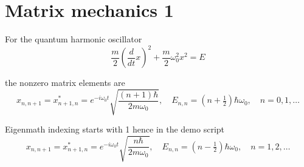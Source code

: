 

\section*{Matrix mechanics 1}

For the quantum harmonic oscillator
\begin{equation*}
\frac{m}{2}\left(\frac{d}{dt}x\right)^2+\frac{m}{2}\omega_0^2x^2=E
\tag{1}
\end{equation*}

the nonzero matrix elements are
\begin{equation*}
x_{n,n+1}=x_{n+1,n}^*=e^{-i\omega_0t}\sqrt{\frac{(n+1)\hbar}{2m\omega_0}},\quad
E_{n,n}=\left(n+\tfrac{1}{2}\right)\hbar\omega_0,\quad
n=0,1,\ldots
\end{equation*}

Eigenmath indexing starts with 1 hence in the demo script
\begin{equation*}
x_{n,n+1}=x_{n+1,n}^*=e^{-i\omega_0t}\sqrt{\frac{n\hbar}{2m\omega_0}},\quad
E_{n,n}=\left(n-\tfrac{1}{2}\right)\hbar\omega_0,\quad
n=1,2,\ldots
\end{equation*}


